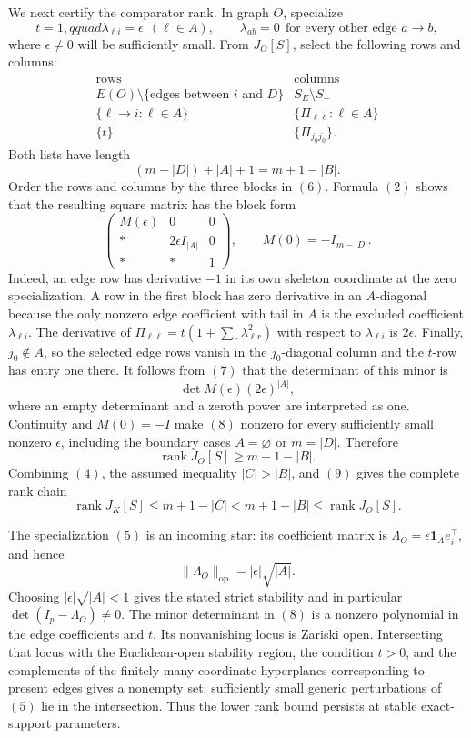 We next certify the comparator rank.  In graph \(O\), specialize
\[
 t=1,qquad \lambda_{\ell i}=\epsilon\ \ (\ell\in A),
 \qquad \lambda_{ab}=0\ \ \text{for every other edge }a\to b,
 \tag{5}
\]
where \(\epsilon\ne0\) will be sufficiently small.  From \(J_O[S]\), select the following rows and columns:
\[
 \begin{array}{c|c}
 \text{rows}&\text{columns}\\ \hline
 E(O)\setminus\{\text{edges between }i\text{ and }D\}
   &S_E\setminus S_-\\
 \{\ell\to i:\ell\in A\}
   &\{\Pi_{\ell\ell}:\ell\in A\}\\
 \{t\}&\{\Pi_{j_0j_0}\}.
 \end{array}
 \tag{6}
\]
Both lists have length
\[
 (m-|D|)+|A|+1=m+1-|B|.
\]
Order the rows and columns by the three blocks in \((6)\).  Formula \((2)\) shows that the resulting square matrix has the block form
\[
 \begin{pmatrix}
 M(\epsilon)&0&0\\
 *&2\epsilon I_{|A|}&0\\
 *&*&1
 \end{pmatrix},
 \qquad M(0)=-I_{m-|D|}.
 \tag{7}
\]
Indeed, an edge row has derivative \(-1\) in its own skeleton coordinate at the zero specialization.  A row in the first block has zero derivative in an \(A\)-diagonal because the only nonzero edge coefficient with tail in \(A\) is the excluded coefficient \(\lambda_{\ell i}\).  The derivative of \(\Pi_{\ell\ell}=t(1+\sum_r\lambda_{\ell r}^2)\) with respect to \(\lambda_{\ell i}\) is \(2\epsilon\).  Finally, \(j_0\notin A\), so the selected edge rows vanish in the \(j_0\)-diagonal column and the \(t\)-row has entry one there.  It follows from \((7)\) that the determinant of this minor is
\[
 \det M(\epsilon)(2\epsilon)^{|A|},
 \tag{8}
\]
where an empty determinant and a zeroth power are interpreted as one.  Continuity and \(M(0)=-I\) make \((8)\) nonzero for every sufficiently small nonzero \(\epsilon\), including the boundary cases \(A=\varnothing\) or \(m=|D|\).  Therefore
\[
\operatorname{rank}J_O[S]\ge m+1-|B|.
\tag{9}
\]
Combining \((4)\), the assumed inequality \(|C|>|B|\), and \((9)\) gives the complete rank chain
\[
 \operatorname{rank}J_K[S]
 \le m+1-|C|
 <m+1-|B|
 \le\operatorname{rank}J_O[S].
\]

The specialization \((5)\) is an incoming star: its coefficient matrix is \(\Lambda_O=\epsilon\mathbf 1_Ae_i^\top\), and hence
\[
 \|\Lambda_O\|_{\mathrm{op}}=|\epsilon|\sqrt{|A|}.
\]
Choosing \(|\epsilon|\sqrt{|A|}<1\) gives the stated strict stability and in particular \(\det(I_p-\Lambda_O)\ne0\).  The minor determinant in \((8)\) is a nonzero polynomial in the edge coefficients and \(t\).  Its nonvanishing locus is Zariski open.  Intersecting that locus with the Euclidean-open stability region, the condition \(t>0\), and the complements of the finitely many coordinate hyperplanes corresponding to present edges gives a nonempty set: sufficiently small generic perturbations of \((5)\) lie in the intersection.  Thus the lower rank bound persists at stable exact-support parameters.

